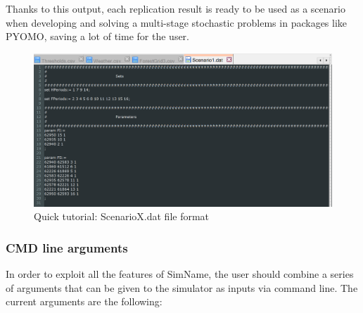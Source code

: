 \documentclass[11pt]{article}
\begin{document}
\begin{enumerate}
\begin{itemize}
Thanks to this output, each replication result is ready to be used as a scenario when developing and solving a multi-stage stochastic problems in packages like PYOMO, saving a lot of time for the user.		
		
		
\begin{figure}[h!]
\centering
\includegraphics[scale=0.6]{Tutorial15.png}
\caption{\label{fig:Tut17} Quick tutorial: ScenarioX.dat file format}
\end{figure}
		
		
	\end{itemize}
	
\end{enumerate}

\subsubsection{CMD line arguments}
In order to exploit all the features of SimName, the user should combine a series of arguments that can be given to the simulator as inputs via command line. The current arguments are the following: 
\end{document}
